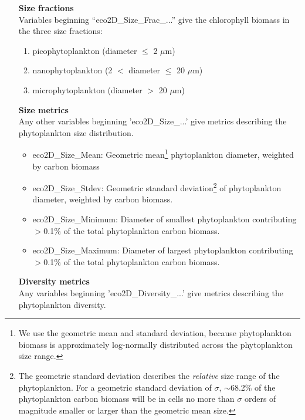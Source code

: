 \documentclass[11pt,fleqn]{book} %
\begin{document}
\vspace{2mm} 
\begin{itemize}[noitemsep]

\item[\textbf{Size fractions}] \
\\Variables beginning ``\textsf{\footnotesize eco2D\_Size\_Frac\_...}'' give the chlorophyll biomass in the three size fractions:
\begin{enumerate}[noitemsep]
\item picophytoplankton (diameter $\le$ 2 $\mu$m)
\item nanophytoplankton (2 $<$ diameter $\le$ 20 $\mu$m)
\item microphytoplankton (diameter $>$ 20 $\mu$m)
\end{enumerate}

\item[\textbf{Size metrics}] \
\\Any other variables beginning '\textsf{\footnotesize eco2D\_Size\_...}' give metrics describing the {phytoplankton} size distribution.

\begin{itemize}[noitemsep]
\item \textsf{\footnotesize eco2D\_Size\_Mean}: Geometric mean\footnote{ We use the geometric mean and standard deviation, because phytoplankton biomass is approximately log-normally distributed across the phytoplankton size range.} phytoplankton diameter, weighted by carbon biomass
\item \textsf{\footnotesize eco2D\_Size\_Stdev}: Geometric standard deviation\footnote{ The geometric standard deviation describes the \textit{relative} size range of the phytoplankton. For a geometric standard deviation of $\sigma$, $\sim$68.2\% of the phytoplankton carbon biomass will be in cells no more than $\sigma$ orders of magnitude smaller or larger than the geometric mean size.} of phytoplankton diameter, weighted by carbon biomass. 
\item \textsf{\footnotesize eco2D\_Size\_Minimum}: Diameter of smallest phytoplankton contributing $>$0.1\% of the total phytoplankton carbon biomass.
\item \textsf{\footnotesize eco2D\_Size\_Maximum}: Diameter of largest phytoplankton contributing $>$0.1\% of the total phytoplankton carbon biomass.
\end{itemize}

\item[\textbf{Diversity metrics}] \
\\Any variables beginning '\textsf{\footnotesize eco2D\_Diversity\_...}' give metrics describing the {phytoplankton} diversity.


\end{itemize}
\end{document}
